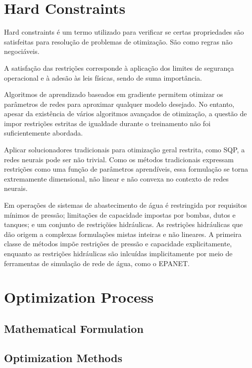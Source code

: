 \section{Hard Constraints}

Hard constraints é um termo utilizado para verificar se certas propriedades são satisfeitas para resolução de problemas de otimização.\cite{rfc16} São como regras não negociáveis.

A satisfação das restrições corresponde à aplicação dos limites de segurança operacional e à adesão às leis físicas, sendo de suma importância\cite{rfc15}.

Algoritmos de aprendizado baseados em gradiente permitem otimizar os parâmetros de redes para aproximar qualquer modelo desejado. No entanto, apesar da existência de vários algoritmos avançados de otimização, a questão de impor restrições estritas de igualdade durante o treinamento não foi suficientemente abordada\cite{rfc10}.

Aplicar solucionadores tradicionais para otimização geral restrita, como SQP\cite{rfc18}, a redes neurais pode ser não trivial. Como os métodos tradicionais expressam restrições como uma função de parâmetros aprendíveis, essa formulação se torna extremamente dimensional, não linear e não convexa no contexto de redes neurais\cite{rfc10}.

Em operações de sistemas de abastecimento de água é restringida por requisitos mínimos de pressão; limitações de capacidade impostas por bombas, dutos e tanques; e um conjunto de restriçõies hidráulicas. As restrições hidráulicas que dão origem a complexas formulações mistas inteiras e não lineares. A primeira classe de métodos impõe restrições de pressão e capacidade explicitamente, enquanto as restrições hidráulicas são inlcuídas implicitamente por meio de ferramentas de simulação de rede de água, como o EPANET. \cite{rfc17}

\section{Optimization Process}

\subsection{Mathematical Formulation}

\subsection{Optimization Methods}

